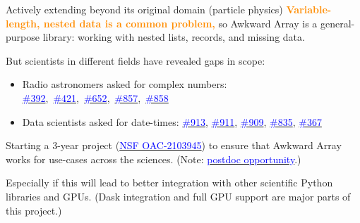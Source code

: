 \documentclass[aspectratio=169]{beamer}
\begin{document}
\begin{frame}{Actively extending beyond its original domain (particle physics)}
\large
\vspace{0.35 cm}
\textcolor{darkorange}{\bf Variable-length, nested data is a common problem,} so Awkward Array is a general-purpose library: working with nested lists, records, and missing data.

\vspace{0.35 cm}
But scientists in different fields have revealed gaps in scope:

\begin{itemize}
\item Radio astronomers asked for complex numbers: \mbox{\normalsize \href{https://github.com/scikit-hep/awkward-1.0/issues/392}{\textcolor{blue}{\#392}}, \href{https://github.com/scikit-hep/awkward-1.0/pull/421}{\textcolor{blue}{\#421}}, \href{https://github.com/scikit-hep/awkward-1.0/pull/652}{\textcolor{blue}{\#652}}, \href{https://github.com/scikit-hep/awkward-1.0/issues/857}{\textcolor{blue}{\#857}}, \href{https://github.com/scikit-hep/awkward-1.0/pull/858}{\textcolor{blue}{\#858}}\hspace{-0.5 cm}}
\item Data scientists asked for date-times: {\normalsize \href{https://github.com/scikit-hep/awkward-1.0/issues/913}{\textcolor{blue}{\#913}}, \href{https://github.com/scikit-hep/awkward-1.0/pull/911}{\textcolor{blue}{\#911}}, \href{https://github.com/scikit-hep/awkward-1.0/issues/909}{\textcolor{blue}{\#909}}, \href{https://github.com/scikit-hep/awkward-1.0/pull/835}{\textcolor{blue}{\#835}}, \href{https://github.com/scikit-hep/awkward-1.0/issues/367}{\textcolor{blue}{\#367}}}
\end{itemize}

\vspace{0.35 cm}
Starting a 3-year project {\normalsize (\href{https://www.nsf.gov/awardsearch/showAward?AWD_ID=2103945&HistoricalAwards=false}{\textcolor{blue}{NSF OAC-2103945}})} to ensure that Awkward Array works for use-cases across the sciences. {\normalsize (Note: \href{https://puwebp.princeton.edu/AcadHire/apply/application.xhtml?listingId=21021}{\textcolor{blue}{postdoc opportunity}}.)}

\vspace{0.35 cm}
\setlength{\fboxsep}{0.3 cm}

\normalsize
\vspace{0.35 cm}
Especially if this will lead to better integration with other scientific Python libraries and GPUs. (Dask integration and full GPU support are major parts of this project.)
\end{frame}
\end{document}
